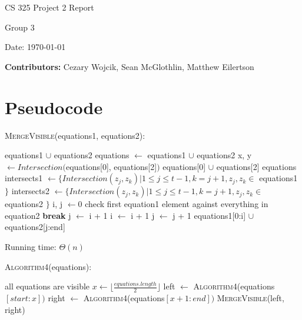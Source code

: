 \documentclass[12pt,letterpaper]{article}
\begin{document}
\begin{titlepage}
    \vspace*{4cm}
    {\huge \center
        CS 325 Project 2 Report\\[1cm]
    }
    \center
    {\large
        Group 3

        Date: \today

    \textbf{Contributors:}
    Cezary Wojcik,
    Sean McGlothlin,
    Matthew Eilertson
    }

\end{titlepage}


\section{Pseudocode}

\textsc{MergeVisible}(equations1, equations2):

\begin{algorithmic}
	\State \Return equations1 $\cup$ equations2
\EndIf
{}
	\State equations $\gets$ equations1 $\cup$ equations2
	\State x, y $\gets Intersection($equations[0], equations[2]$)$
		\State \Return equations[0] $\cup$ equations[2]
	\Else
		\State \Return equations
	\EndIf
\EndIf
\State intersects1 $\gets \{ Intersection(z_j, z_k) | 1 \leq j \leq t - 1, k = j + 1, z_j,z_k \in$ equations1 $\}$
\State intersects2 $\gets \{ Intersection(z_j, z_k) | 1 \leq j \leq t - 1, k = j + 1, z_j,z_k \in$ equations2 $\}$
\State i, j $\gets 0$
\State check first equation1 element against everything in equation2
		\State \textbf{break}
		\State j $\gets$ i + 1
		\State i $\gets$ i + 1
	\Else
		\State j $\gets$ j + 1
	\EndIf
\EndWhile
\State \Return equations1[0:i] $\cup$ equations2[j:end]
\end{algorithmic}

Running time: $\Theta(n)$

\textsc{Algorithm4}(equations):

\begin{algorithmic}
	\State all equations are visible
\Else
	\State $x \gets \lfloor\frac{equations.length}{2}\rfloor$
	\State left $\gets$ \textsc{Algorithm4}(equations$[start:x])$
	\State right $\gets$ \textsc{Algorithm4}(equations$[x+1:end])$
	\State \Return \textsc{MergeVisible}(left, right)
\EndIf
\end{algorithmic}
\end{document}
